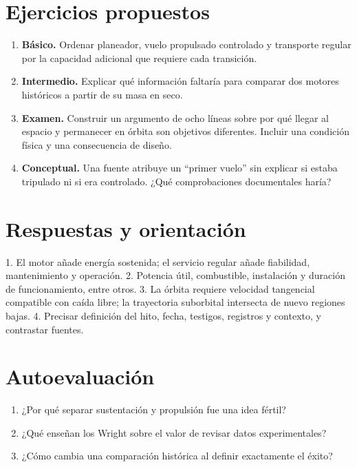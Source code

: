 \section{Ejercicios propuestos}
\begin{enumerate}
\item \textbf{Básico.} Ordenar planeador, vuelo propulsado controlado y transporte regular por la capacidad adicional que requiere cada transición.
\item \textbf{Intermedio.} Explicar qué información faltaría para comparar dos motores históricos a partir de su masa en seco.
\item \textbf{Examen.} Construir un argumento de ocho líneas sobre por qué llegar al espacio y permanecer en órbita son objetivos diferentes. Incluir una condición física y una consecuencia de diseño.
\item \textbf{Conceptual.} Una fuente atribuye un ``primer vuelo'' sin explicar si estaba tripulado ni si era controlado. ¿Qué comprobaciones documentales haría?
\end{enumerate}
\section{Respuestas y orientación}
1. El motor añade energía sostenida; el servicio regular añade fiabilidad, mantenimiento y operación. 2. Potencia útil, combustible, instalación y duración de funcionamiento, entre otros. 3. La órbita requiere velocidad tangencial compatible con caída libre; la trayectoria suborbital intersecta de nuevo regiones bajas. 4. Precisar definición del hito, fecha, testigos, registros y contexto, y contrastar fuentes.

\section{Autoevaluación}
\begin{enumerate}
\item ¿Por qué separar sustentación y propulsión fue una idea fértil?
\item ¿Qué enseñan los Wright sobre el valor de revisar datos experimentales?
\item ¿Cómo cambia una comparación histórica al definir exactamente el éxito?
\end{enumerate}


\studiumchaptercheck
